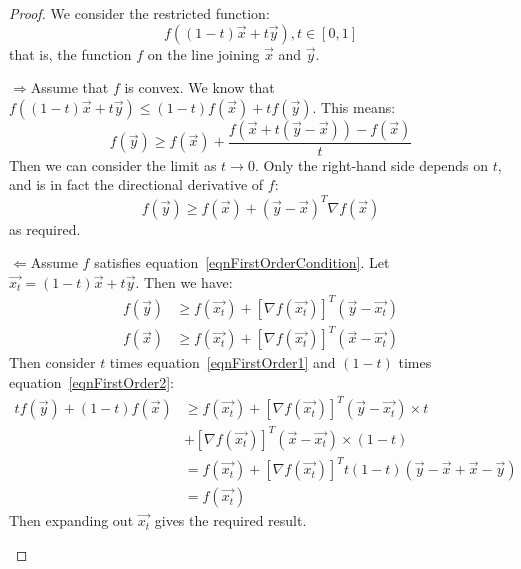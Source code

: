 \documentclass[../Main.tex]{subfiles}
\begin{document}
\begin{proof}
    We consider the restricted function:
    \begin{equation*}
        f((1-t)\vec{x} + t\vec{y}), t \in [0, 1]
    \end{equation*}
    that is, the function $f$ on the line joining $\vec{x}$ and $\vec{y}$.
    \begin{proofdirection}{$\Rightarrow$}{Assume that $f$ is convex.}
        We know that $f((1-t)\vec{x} + t\vec{y}) \leq (1-t)f(\vec{x}) + tf(\vec{y})$. This means:
        \begin{equation*}
            f(\vec{y}) \geq f(\vec{x}) + \frac{f(\vec{x} + t(\vec{y}-\vec{x})) - f(\vec{x})}{t}
        \end{equation*}
        Then we can consider the limit as $t \to 0$. Only the right-hand side depends on $t$, and is in fact the directional derivative of $f$:
        \begin{equation*}
            f(\vec{y}) \geq f(\vec{x}) + (\vec{y} - \vec{x})^T \nabla f(\vec{x})
        \end{equation*}
        as required.
    \end{proofdirection}
    \begin{proofdirection}{$\Leftarrow$}{Assume $f$ satisfies equation~\ref{eqnFirstOrderCondition}.}
        Let $\vec{x_t} = (1 - t)\vec{x} + t\vec{y}$. Then we have:
        \begin{align}
            f(\vec{y}) &\geq f(\vec{x_t}) + \left[\nabla f(\vec{x_t})\right]^T (\vec{y} - \vec{x_t}) \label{eqnFirstOrder1} \\
            f(\vec{x}) &\geq f(\vec{x_t}) + \left[\nabla f(\vec{x_t})\right]^T (\vec{x} - \vec{x_t}) \label{eqnFirstOrder2}
        \end{align}
        Then consider $t$ times equation~\ref{eqnFirstOrder1} and $(1-t)$ times equation~\ref{eqnFirstOrder2}:
        \begin{align*}
            tf(\vec{y}) + (1-t)f(\vec{x}) &\geq f(\vec{x_t}) + \left[\nabla f(\vec{x_t})\right]^T (\vec{y} - \vec{x_t}) \times t \\
            &+ \left[\nabla f(\vec{x_t})\right]^T (\vec{x} - \vec{x_t}) \times (1-t) \\
            &= f(\vec{x_t}) + \left[\nabla f(\vec{x_t})\right]^T t(1-t)(\vec{y} - \vec{x} + \vec{x} - \vec{y}) \\
            &= f(\vec{x_t})
        \end{align*}
        Then expanding out $\vec{x_t}$ gives the required result.
    \end{proofdirection}
\end{proof}
\end{document}
